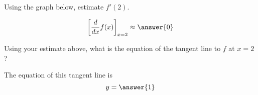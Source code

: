 \documentclass{ximera}
\author{Steven Gubkin}
\begin{document}
\begin{exercise}
Using the graph below, estimate   $ f'(2)$.

\begin{prompt}
$$\bigg[ \frac{d}{dx} f(x) \bigg]_{x = 2} \approx \answer{0}$$
\end{prompt}


Using your estimate above, what is the equation of the tangent line to $f$ at $x=2$? 

\begin{prompt} 
The equation of this tangent line is
$$ y = \answer{1}$$ 
\end{prompt}

\end{exercise}
\end{document}
